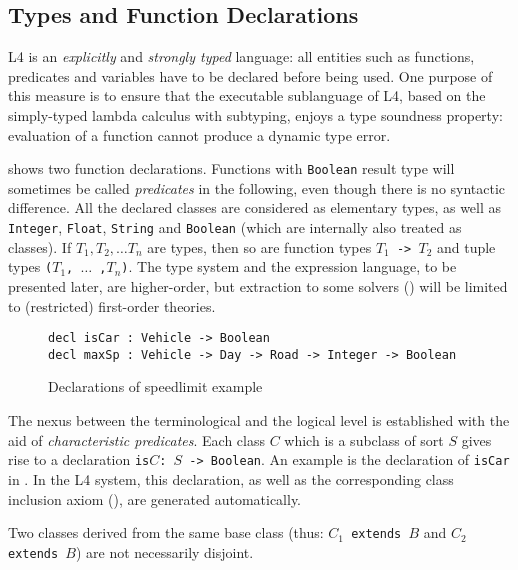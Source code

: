 \subsection{Types and Function Declarations}\label{sec:fundecls}

L4 is an \emph{explicitly} and \emph{strongly typed} language: all entities
such as functions, predicates and variables have to be declared before being
used. One purpose of this measure is to ensure that the executable sublanguage
of L4, based on the simply-typed lambda calculus with subtyping, enjoys a type
soundness property: evaluation of a function cannot produce a dynamic type
error.

 shows two function declarations. Functions with
\texttt{Boolean} result type will sometimes be called \emph{predicates} in the
following, even though there is no syntactic difference. All the declared
classes are considered as elementary types, as well as \texttt{Integer},
\texttt{Float}, \texttt{String} and \texttt{Boolean} (which are internally also treated as
classes). If $T_1, T_2, \dots T_n$ are types, then so are function types
\texttt{$T_1$ -> $T_2$} and tuple types \texttt{($T_1$, $\dots$ ,$T_n$)}. The
type system and the expression language, to be presented later, are
higher-order, but extraction to some solvers (\secref{}) will be limited to
(restricted) first-order theories.

\begin{figure}[h]
\begin{lstlisting}
decl isCar : Vehicle -> Boolean
decl maxSp : Vehicle -> Day -> Road -> Integer -> Boolean
\end{lstlisting}
  \caption{Declarations of speedlimit example}\label{fig:fundecls}
\end{figure}

The nexus between the terminological and the logical level is established with
the aid of \emph{characteristic predicates}. Each class $C$ which is a
subclass of sort $S$ gives rise to a declaration \texttt{is$C$: $S$ ->
  Boolean}. An example is the declaration of \texttt{isCar} in
. In the L4 system, this declaration, as well as the
corresponding class inclusion axiom (), are generated
automatically.

Two classes derived from the same base class (thus: \texttt{$C_1$ extends $B$}
and \texttt{$C_2$ extends $B$}) are not necessarily disjoint. 

